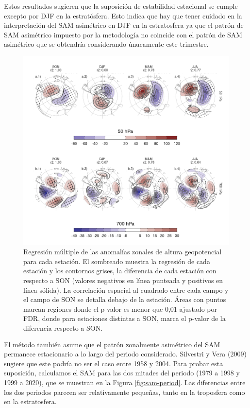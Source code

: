 \documentclass[12pt,oneside,a4paper]{reedthesis}
\begin{document}
Estos resultados sugieren que la suposición de estabilidad estacional se cumple excepto por DJF en la estratósfera.
Esto indica que hay que tener cuidado en la interpretación del SAM asimétrico en DJF en la estratosfera ya que el patrón de SAM asimétrico impuesto por la metodología no coincide con el patrón de SAM asimétrico que se obtendría considerando únucamente este trimestre.



\begin{figure}

{\centering \includegraphics{figures/30-sam/season-regression-1} 

}

\caption{Regresión múltiple de las anomalías zonales de altura geopotencial para cada estación. El sombreado muestra la regresión de cada estación y los contornos grises, la diferencia de cada estación con respecto a SON (valores negativos en línea punteada y positivos en línea sólida). La correlación espacial al cuadrado entre cada campo y el campo de SON se detalla debajo de la estación. Áreas con puntos marcan regiones donde el p-valor es menor que 0,01 ajustado por FDR, donde para estaciones distintas a SON, marca el p-valor de la diferencia respecto a SON.}\label{fig:season-regression}
\end{figure}

El método también asume que el patrón zonalmente asimétrico del SAM permanece estacionario a lo largo del periodo considerado.
Silvestri y Vera (2009) sugiere que este podría no ser el caso entre 1958 y 2004.
Para probar esta suposición, calculamos el SAM para las dos mitades del periodo (1979 a 1998 y 1999 a 2020), que se muestran en la Figura \ref{fig:sam-period}.
Las diferencias entre los dos periodos parecen ser relativamente pequeñas, tanto en la troposfera como en la estratosfera.
\end{document}
